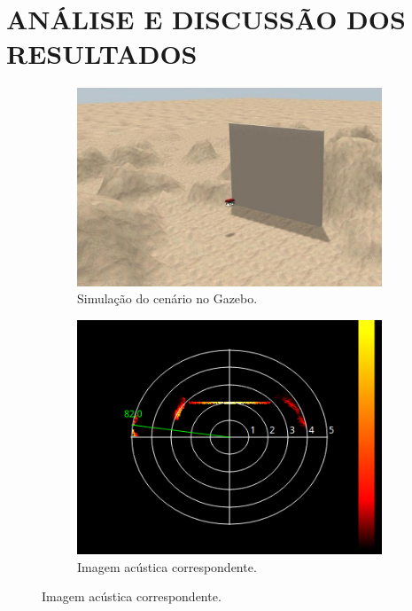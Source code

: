 
\chapter{ANÁLISE E DISCUSSÃO DOS RESULTADOS}
\label{chap:resultados}

\begin{figure}[H]
    \centering
    \caption{Imagem acústica do sonar gerada em um ambiente de simulação.}
    \label{fig:imagem_gpu_msis}
    \begin{subfigure}[t]{0.5\textwidth}
        \includegraphics[width=\textwidth]{dados/figuras/wall2.jpg}
        \caption{Simulação do cenário no Gazebo.}
    \end{subfigure}
    \begin{subfigure}[t]{0.42\textwidth}
        \includegraphics[width=\textwidth]{dados/figuras/heightmap_wall.png}
        \caption{Imagem acústica correspondente.}
    \end{subfigure}
\end{figure}